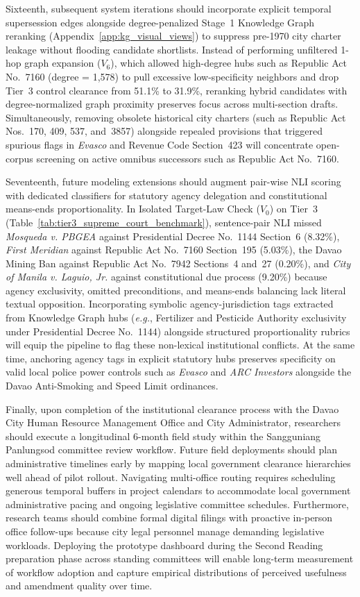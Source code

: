 Sixteenth, subsequent system iterations should incorporate explicit temporal supersession edges alongside degree-penalized Stage~1 Knowledge Graph reranking (Appendix~\ref{app:kg_visual_views}) to suppress pre-1970 city charter leakage without flooding candidate shortlists. Instead of performing unfiltered 1-hop graph expansion ($V_6$), which allowed high-degree hubs such as Republic Act No.~7160 (degree = 1,578) to pull excessive low-specificity neighbors and drop Tier~3 control clearance from 51.1\% to 31.9\%, reranking hybrid candidates with degree-normalized graph proximity preserves focus across multi-section drafts. Simultaneously, removing obsolete historical city charters (such as Republic Act Nos.~170, 409, 537, and~3857) alongside repealed provisions that triggered spurious flags in \textit{Evasco} and Revenue Code Section~423 will concentrate open-corpus screening on active omnibus successors such as Republic Act No.~7160.

Seventeenth, future modeling extensions should augment pair-wise NLI scoring with dedicated classifiers for statutory agency delegation and constitutional means-ends proportionality. In Isolated Target-Law Check ($V_0$) on Tier~3 (Table~\ref{tab:tier3_supreme_court_benchmark}), sentence-pair NLI missed \textit{Mosqueda v. PBGEA} against Presidential Decree No.~1144 Section~6 (8.32\%), \textit{First Meridian} against Republic Act No.~7160 Section~195 (5.03\%), the Davao Mining Ban against Republic Act No.~7942 Sections~4 and~27 (0.20\%), and \textit{City of Manila v. Laguio, Jr.} against constitutional due process (9.20\%) because agency exclusivity, omitted preconditions, and means-ends balancing lack literal textual opposition. Incorporating symbolic agency-jurisdiction tags extracted from Knowledge Graph hubs (\textit{e.g.}, Fertilizer and Pesticide Authority exclusivity under Presidential Decree No.~1144) alongside structured proportionality rubrics will equip the pipeline to flag these non-lexical institutional conflicts. At the same time, anchoring agency tags in explicit statutory hubs preserves specificity on valid local police power controls such as \textit{Evasco} and \textit{ARC Investors} alongside the Davao Anti-Smoking and Speed Limit ordinances.

Finally, upon completion of the institutional clearance process with the Davao City Human Resource Management Office and City Administrator, researchers should execute a longitudinal 6-month field study within the Sangguniang Panlungsod committee review workflow. Future field deployments should plan administrative timelines early by mapping local government clearance hierarchies well ahead of pilot rollout. Navigating multi-office routing requires scheduling generous temporal buffers in project calendars to accommodate local government administrative pacing and ongoing legislative committee schedules. Furthermore, research teams should combine formal digital filings with proactive in-person office follow-ups because city legal personnel manage demanding legislative workloads. Deploying the prototype dashboard during the Second Reading preparation phase across standing committees will enable long-term measurement of workflow adoption and capture empirical distributions of perceived usefulness and amendment quality over time.
